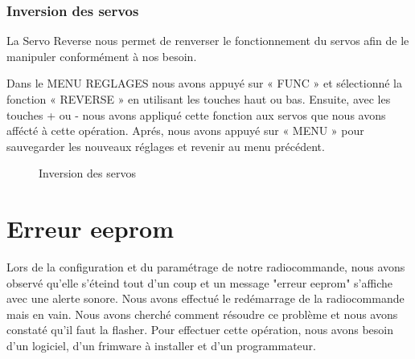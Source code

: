 	
	
	
	\subsubsection{Inversion des servos}
	La Servo Reverse nous permet de renverser le fonctionnement du servos afin de le manipuler conformément à nos besoin.
	
	
	
	Dans le MENU REGLAGES nous avons appuyé sur « FUNC » et sélectionné la fonction « REVERSE » en utilisant les touches haut ou bas. Ensuite, avec les touches + ou -
	nous avons appliqué cette fonction aux servos que nous avons affécté à cette opération. Aprés, nous avons appuyé sur « MENU » pour sauvegarder les nouveaux réglages et revenir au menu précédent.
	\begin{figure}[H]
		\begin{center}
			\centering
		\end{center}
		\caption{Inversion des servos}
	\end{figure}
	\section{Erreur eeprom}
	Lors de la configuration et du paramétrage de notre radiocommande, nous avons observé qu'elle s'éteind tout d'un coup et un message "erreur eeprom" s'affiche avec une alerte sonore. Nous avons effectué le redémarrage de la radiocommande mais en vain. Nous avons cherché comment résoudre ce problème et nous avons constaté qu'il faut la flasher. Pour effectuer cette opération, nous avons besoin d'un logiciel, d'un frimware à installer et d'un programmateur.
